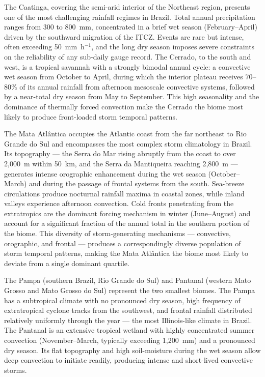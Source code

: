 \documentclass[a4paper,fleqn]{cas-sc}
\begin{document}
The Caatinga, covering the semi-arid interior of the Northeast region,
presents one of the most challenging rainfall regimes in Brazil.
Total annual precipitation ranges from 300 to 800~mm, concentrated
in a brief wet season (February–April) driven by the southward
migration of the ITCZ. Events are rare but intense, often exceeding
50~mm~h$^{-1}$, and the long dry season imposes severe constraints
on the reliability of any sub-daily gauge record. The Cerrado, to
the south and west, is a tropical savannah with a strongly bimodal
annual cycle: a convective wet season from October to April, during
which the interior plateau receives 70–80\% of its annual rainfall
from afternoon mesoscale convective systems, followed by a near-total
dry season from May to September. This high seasonality and the
dominance of thermally forced convection make the Cerrado the biome
most likely to produce front-loaded storm temporal patterns.

The Mata Atlântica occupies the Atlantic coast from the far northeast
to Rio Grande do Sul and encompasses the most complex storm
climatology in Brazil. Its topography — the Serra do Mar rising
abruptly from the coast to over 2,000~m within 50~km, and the
Serra da Mantiqueira reaching 2,800~m — generates intense
orographic enhancement during the wet season (October–March) and
during the passage of frontal systems from the south. Sea-breeze
circulations produce nocturnal rainfall maxima in coastal zones,
while inland valleys experience afternoon convection. Cold fronts
penetrating from the extratropics are the dominant forcing mechanism
in winter (June–August) and account for a significant fraction of
the annual total in the southern portion of the biome. This diversity
of storm-generating mechanisms — convective, orographic, and frontal
— produces a correspondingly diverse population of storm temporal
patterns, making the Mata Atlântica the biome most likely to deviate
from a single dominant quartile.

The Pampa (southern Brazil, Rio Grande do Sul) and Pantanal (western
Mato Grosso and Mato Grosso do Sul) represent the two smallest
biomes. The Pampa has a subtropical climate with no pronounced dry
season, high frequency of extratropical cyclone tracks from the
southwest, and frontal rainfall distributed relatively uniformly
through the year — the most Illinois-like climate in Brazil. The
Pantanal is an extensive tropical wetland with highly concentrated
summer convection (November–March, typically exceeding 1,200~mm)
and a pronounced dry season. Its flat topography and high soil-moisture
during the wet season allow deep convection to initiate readily,
producing intense and short-lived convective storms.
\end{document}
